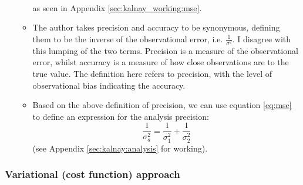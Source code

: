 \begin{itemize}
\begin{itemize}
\begin{subequations}
\begin{align}
            \end{align}
        \end{subequations}
        as seen in Appendix \ref{sec:kalnay_working:mse}.
        \item  The author takes precision and accuracy to be synonymous, defining them to be the inverse of the observational error, i.e. $\frac{1}{\sigma^2}$. I disagree with this lumping of the two terms. Precision is a measure of the observational error, whilst accuracy is a measure of how close observations are to the true value. The definition here refers to precision, with the level of observational bias indicating the accuracy.
        \item Based on the above definition of precision, we can use equation \ref{eq:mse} to define an expression for the analysis precision:
        \begin{equation}
            \frac{1}{\sigma_a^2} = \frac{1}{\sigma_1^2} + \frac{1}{\sigma_2^2} \label{eq:}
        \end{equation}
        (see Appendix \ref{sec:kalnay:analysis} for working).
    \end{itemize}
\end{itemize}

\subsubsection{Variational (cost function) approach}
\label{subs:squares:variational}

